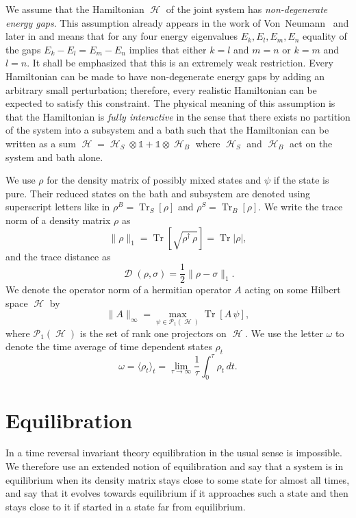 \documentclass[aps,prl,twocolumn,showpacs,showkeys,a4paper]{revtex4}
\DeclareMathOperator{\Tr}{\mathrm{Tr}}%
\DeclareMathOperator{\tracedistance}{\mathcal{D}}
\DeclareMathOperator{\hiH}{\mathcal{H}}%
\DeclareMathOperator{\haH}{\mathscr{H}}%
\newcommand{\expect}[1]{\langle #1\rangle}
\begin{document}
We assume that the Hamiltonian $\haH$ of the joint system has \emph{non-degenerate energy gaps}.
This assumption already appears in the work of Von~Neumann~\cite{vonneumann1929} and later in \cite{Linden09,Reimann08,0907.0108v1} and means that for any four energy eigenvalues $E_k,E_l,E_m,E_n$ equality of the gaps $E_k - E_l = E_m - E_n$ implies that either $k=l$ and $m=n$ or $k=m$ and $l=n$.
It shall be emphasized that this is an extremely weak restriction.
Every Hamiltonian can be made to have non-degenerate energy gaps by adding an arbitrary small perturbation; therefore, every realistic Hamiltonian can be expected to satisfy this constraint.
The physical meaning of this assumption is that the Hamiltonian is \emph{fully interactive} in the sense that there exists no partition of the system into a subsystem and a bath such that the Hamiltonian can be written as a sum $\haH = \haH_S \otimes \mathds{1} + \mathds{1} \otimes \haH_B$ where $\haH_S$ and $\haH_B$ act on the system and bath alone.

We use $\rho$ for the density matrix of possibly mixed states and $\psi$ if the state is pure.
Their reduced states on the bath and subsystem are denoted using superscript letters like in $\rho^B =\Tr_S[\rho]$ and $\rho^S =\Tr_B[\rho]$.
We write the trace norm of a density matrix $\rho$ as
\begin{equation}
  \|\rho\|_1 = \Tr[\sqrt{\rho^\dagger\,\rho}] = \Tr|\rho| ,
\end{equation}
and the trace distance as
\begin{equation}
  \label{eq:definitiontracedistance}
  \tracedistance(\rho,\sigma) = \frac{1}{2} \|\rho -\sigma \|_1 .
\end{equation}
We denote the operator norm of a hermitian operator $A$ acting on some Hilbert space $\hiH$ by
\begin{equation}
  \|A\|_\infty = \max_{\psi \in \mathcal{P}_1(\hiH)} \Tr[A\,\psi] ,
\end{equation}
where $\mathcal{P}_1(\hiH)$ is the set of rank one projectors on $\hiH$.
We use the letter $\omega$ to denote the time average of time dependent states $\rho_t$
\begin{equation}
  \omega = \expect{\rho_t}_t = \lim_{\tau\to\infty} \frac{1}{\tau} \int_0^\tau \rho_t\,dt .
\end{equation}

\section{Equilibration}
\label{sec:equilibration}
%
In a time reversal invariant theory equilibration in the usual sense is impossible.
We therefore use an extended notion of equilibration and say that a system is in equilibrium when its density matrix stays close to some state for almost all times, and say that it evolves towards equilibrium if it approaches such a state and then stays close to it if started in a state far from equilibrium.
\end{document}
